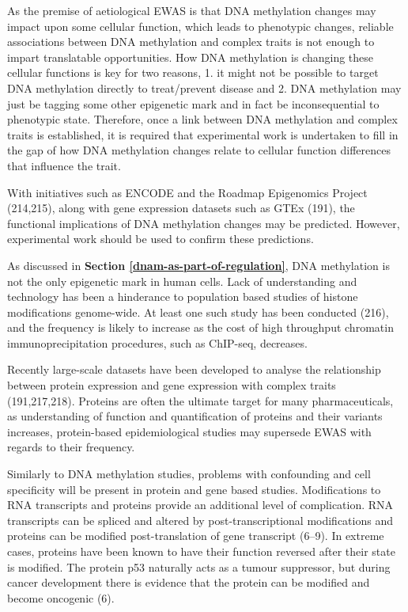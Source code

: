\documentclass[11pt,oneside]{bristolthesis}
\begin{document}
As the premise of aetiological EWAS is that DNA methylation changes may impact upon some cellular function, which leads to phenotypic changes, reliable associations between DNA methylation and complex traits is not enough to impart translatable opportunities. How DNA methylation is changing these cellular functions is key for two reasons, 1. it might not be possible to target DNA methylation directly to treat/prevent disease and 2. DNA methylation may just be tagging some other epigenetic mark and in fact be inconsequential to phenotypic state. Therefore, once a link between DNA methylation and complex traits is established, it is required that experimental work is undertaken to fill in the gap of how DNA methylation changes relate to cellular function differences that influence the trait.

With initiatives such as ENCODE and the Roadmap Epigenomics Project (214,215), along with gene expression datasets such as GTEx (191), the functional implications of DNA methylation changes may be predicted. However, experimental work should be used to confirm these predictions.

As discussed in \textbf{Section \ref{dnam-as-part-of-regulation}}, DNA methylation is not the only epigenetic mark in human cells. Lack of understanding and technology has been a hinderance to population based studies of histone modifications genome-wide. At least one such study has been conducted (216), and the frequency is likely to increase as the cost of high throughput chromatin immunoprecipitation procedures, such as ChIP-seq, decreases.

Recently large-scale datasets have been developed to analyse the relationship between protein expression and gene expression with complex traits (191,217,218). Proteins are often the ultimate target for many pharmaceuticals, as understanding of function and quantification of proteins and their variants increases, protein-based epidemiological studies may supersede EWAS with regards to their frequency.

Similarly to DNA methylation studies, problems with confounding and cell specificity will be present in protein and gene based studies. Modifications to RNA transcripts and proteins provide an additional level of complication. RNA transcripts can be spliced and altered by post-transcriptional modifications and proteins can be modified post-translation of gene transcript (6--9). In extreme cases, proteins have been known to have their function reversed after their state is modified. The protein p53 naturally acts as a tumour suppressor, but during cancer development there is evidence that the protein can be modified and become oncogenic (6).
\end{document}
